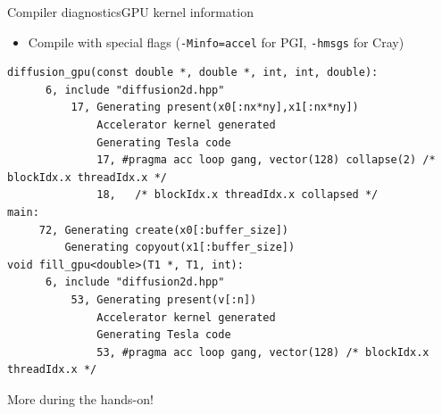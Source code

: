 \documentclass[aspectratio=169,12pt]{beamer}
\begin{document}
\begin{frame}[fragile]{Compiler diagnostics}{GPU kernel information}
  \begin{itemize}
  \item Compile with special flags (\texttt{-Minfo=accel} for PGI, \texttt{-hmsgs} for Cray)
  \end{itemize}

  \begin{lstlisting}[basicstyle=\ttfamily\tiny]
diffusion_gpu(const double *, double *, int, int, double):
      6, include "diffusion2d.hpp"
          17, Generating present(x0[:nx*ny],x1[:nx*ny])
              Accelerator kernel generated
              Generating Tesla code
              17, #pragma acc loop gang, vector(128) collapse(2) /* blockIdx.x threadIdx.x */
              18,   /* blockIdx.x threadIdx.x collapsed */
main:
     72, Generating create(x0[:buffer_size])
         Generating copyout(x1[:buffer_size])
void fill_gpu<double>(T1 *, T1, int):
      6, include "diffusion2d.hpp"
          53, Generating present(v[:n])
              Accelerator kernel generated
              Generating Tesla code
              53, #pragma acc loop gang, vector(128) /* blockIdx.x threadIdx.x */
  \end{lstlisting}
\end{frame}

\begin{frame}{}
  \large
  \begin{center}
    More during the hands-on!
  \end{center}
\end{frame}

\end{document}
